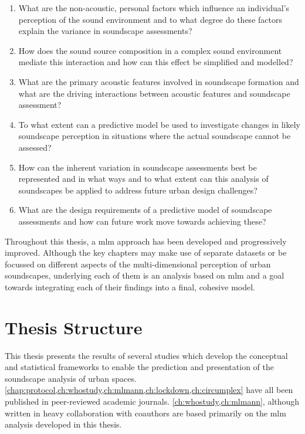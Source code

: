 \begin{enumerate}
  \item What are the non-acoustic, personal factors which influence an individual's perception of the sound environment and to what degree do these factors explain the variance in soundscape assessments? 
  \item How does the sound source composition in a complex sound environment mediate this interaction and how can this effect be simplified and modelled? 
  \item What are the primary acoustic features involved in soundscape formation and what are the driving interactions between acoustic features and soundscape assessment?
  \item To what extent can a predictive model be used to investigate changes in likely soundscape perception in situations where the actual soundscape cannot be assessed? 
  \item How can the inherent variation in soundscape assessments best be represented and in what ways and to what extent can this analysis of soundscapes be applied to address future urban design challenges? 
  \item What are the design requirements of a predictive model of soundscape assessments and how can future work move towards achieving these?
\end{enumerate}

Throughout this thesis, a \gls{mlm} approach has been developed and progressively improved. Although the key chapters may make use of separate datasets or be focussed on different aspects of the multi-dimensional perception of urban soundscapes, underlying each of them is an analysis based on \gls{mlm} and a goal towards integrating each of their findings into a final, cohesive model.

\section{Thesis Structure}

This thesis presents the results of several studies which develop the conceptual and statistical frameworks to enable the prediction and presentation of the soundscape analysis of urban spaces. \cref{chap:protocol,ch:whostudy,ch:mlmann,ch:lockdown,ch:circumplex} have all been published in peer-reviewed academic journals. \cref{ch:whostudy,ch:mlmann}, although written in heavy collaboration with coauthors are based primarily on the \gls{mlm} analysis developed in this thesis.

